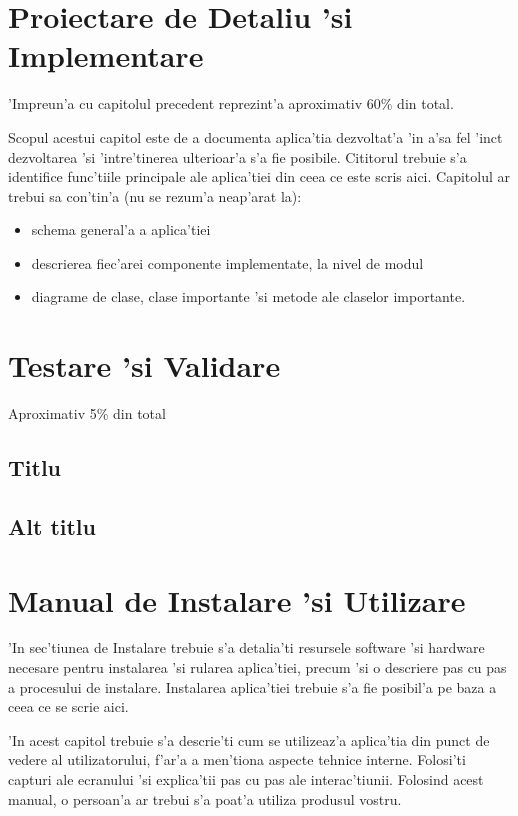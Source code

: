 \documentclass[12pt,a4paper,twoside]{report}
\begin{document}
\chapter{Proiectare de Detaliu 'si Implementare}

'Impreun'a cu capitolul precedent reprezint'a aproximativ 60\% din total.

Scopul acestui capitol este de a documenta aplica'tia dezvoltat'a 'in a'sa fel 'inc\ia t dezvoltarea 'si 'intre'tinerea ulterioar'a s'a fie posibile. 
Cititorul trebuie s'a identifice func'tiile principale ale aplica'tiei din ceea ce este scris aici.
Capitolul ar trebui sa con'tin'a (nu se rezum'a neap'arat la):
\begin{itemize}
 \item schema general'a a aplica'tiei
\item descrierea fiec'arei componente implementate, la nivel de modul
\item diagrame de clase, clase importante 'si metode ale claselor importante.
\end{itemize}


\chapter{Testare 'si Validare}

Aproximativ 5\% din total

\section{Titlu}
\section{Alt titlu}

\chapter{Manual de Instalare 'si Utilizare}

'In sec'tiunea de Instalare trebuie s'a detalia'ti resursele software 'si hardware necesare pentru instalarea 'si rularea aplica'tiei, precum 'si o descriere pas cu pas a procesului de instalare. 
Instalarea aplica'tiei trebuie s'a fie posibil'a pe baza a ceea ce se scrie aici.

'In acest capitol trebuie s'a descrie'ti cum se utilizeaz'a aplica'tia din punct de vedere al utilizatorului, f'ar'a a men'tiona aspecte tehnice interne.
Folosi'ti capturi ale ecranului 'si explica'tii pas cu pas ale interac'tiunii. 
Folosind acest manual, o persoan'a ar trebui s'a poat'a utiliza produsul vostru.
\end{document}
